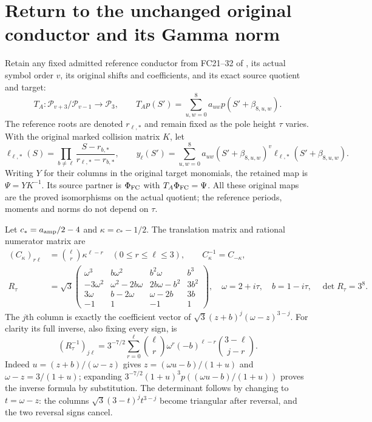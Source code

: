 \documentclass[11pt]{article}
\begin{document}
\section{Return to the unchanged original conductor and its Gamma norm}
Retain any fixed admitted reference conductor from FC21--32
of \cite{Fable029}, its actual symbol order $v$, its original shifts
and coefficients, and its exact source quotient and target:
\[
T_A:\mathcal P_{v+3}/\mathcal P_{v-1}\longrightarrow\mathcal P_3,
\qquad T_Ap(S')=\sum_{u,w=0}^8 a_{uw}p(S'+\beta_{8,u,w}).
\]
The reference roots are denoted $r_{\ell,*}$ and remain fixed
as the pole height $\tau$ varies. With the original marked
collision matrix $K$, let
\[
\ell_{\ell,*}(S)=
\prod_{b\ne\ell}\frac{S-r_{b,*}}{r_{\ell,*}-r_{b,*}},\qquad
y_\ell(S')=\sum_{u,w=0}^8a_{uw}
 (S'+\beta_{8,u,w})^v\ell_{\ell,*}(S'+\beta_{8,u,w}).
\]
Writing $Y$ for their columns in the original target monomials,
the retained map is $\Psi=YK^{-1}$. Its source partner is
$\Phi_{\rm FC}$ with $T_A\Phi_{\rm FC}=\Psi$.
All these original maps are the proved isomorphisms on the
actual quotient; the reference periods, moments and norms do
not depend on $\tau$.

Let $c_*=a_{\rm amp}/2-4$ and $\kappa=c_*-1/2$.
The translation matrix and rational numerator matrix are
\begin{align}
(C_\kappa)_{r\ell}&=\binom{\ell}{r}\kappa^{\ell-r}
 \quad(0\le r\le\ell\le3),\qquad
C_\kappa^{-1}=C_{-\kappa},\nonumber\\
R_\tau&=\sqrt3
\begin{pmatrix}
\omega^3&b\omega^2&b^2\omega&b^3\\
-3\omega^2&\omega^2-2b\omega&2b\omega-b^2&3b^2\\
3\omega&b-2\omega&\omega-2b&3b\\
-1&1&-1&1
\end{pmatrix},
\quad \omega=2+i\tau,\quad b=1-i\tau,\quad \det R_\tau=3^8.
\tag{CP19}
\end{align}
The $j$th column is exactly the coefficient vector of
$\sqrt3(z+b)^j(\omega-z)^{3-j}$.
For clarity its full inverse, also fixing every sign, is
\[
(R_\tau^{-1})_{j\ell}
=3^{-7/2}\sum_{r=0}^{\ell}
\binom{\ell}{r}\omega^r(-b)^{\ell-r}\binom{3-\ell}{j-r}.
\]
Indeed $u=(z+b)/(\omega-z)$ gives
$z=(\omega u-b)/(1+u)$ and $\omega-z=3/(1+u)$;
expanding $3^{-7/2}(1+u)^3p((\omega u-b)/(1+u))$
proves the inverse formula by substitution.
The determinant follows by changing to $t=\omega-z$:
the columns $\sqrt3(3-t)^jt^{3-j}$ become triangular
after reversal, and the two reversal signs cancel.
\end{document}
